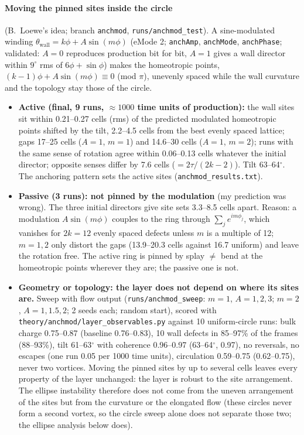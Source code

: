 \paragraph{Moving the pinned sites inside the circle} (B.~Loewe's idea; branch \texttt{anchmod}, \texttt{runs/anchmod\_test}). A sine-modulated winding
$\theta_\mathrm{wall}=k\phi+A\sin(m\phi)$ (eMode 2; \texttt{anchAmp}, \texttt{anchMode}, \texttt{anchPhase}; validated: $A=0$ reproduces production bit for bit, $A=1$
gives a wall director within $9^\circ$ rms of $6\phi+\sin\phi$) makes the homeotropic points, $(k-1)\phi+A\sin(m\phi)\equiv0$ (mod $\pi$), unevenly spaced while the
wall curvature and the topology stay those of the circle.
\begin{itemize}
  \item \textbf{Active (final, 9 runs, $\approx1000$ time units of production):} the wall sites sit within 0.21--0.27 cells (rms) of the predicted modulated
        homeotropic points shifted by the tilt, 2.2--4.5 cells from the best evenly spaced lattice; gaps 17--25 cells ($A=1$, $m=1$) and 14.6--30 cells ($A=1$, $m=2$);
        runs with the same sense of rotation agree within 0.06--0.13 cells whatever the initial director; opposite senses differ by 7.6 cells ($=2\tau/(2k-2)$). Tilt
        63--64$^\circ$. The anchoring pattern sets the active sites (\texttt{anchmod\_results.txt}).
  \item \textbf{Passive (3 runs): not pinned by the modulation} (my prediction was wrong). The three initial directors give site sets 3.3--8.5 cells apart. Reason: a
        modulation $A\sin(m\phi)$ couples to the ring through $\sum_je^{im\phi_j}$, which vanishes for $2k=12$ evenly spaced defects unless $m$ is a multiple of 12; $m=1,2$
        only distort the gaps (13.9--20.3 cells against 16.7 uniform) and leave the rotation free. The active ring is pinned by splay $\neq$ bend at the homeotropic points
        wherever they are; the passive one is not.
  \item \textbf{Geometry or topology: the layer does not depend on where its sites are.} Sweep with flow output (\texttt{runs/anchmod\_sweep}: $m=1$, $A=1,2,3$;
        $m=2$, $A=1,1.5,2$; 2 seeds each; random start), scored with \texttt{theory/anchmod/layer\_observables.py} against 10 uniform-circle runs: bulk charge
        0.75--0.87 (baseline 0.76--0.83), 10 wall defects in 85--97\% of the frames (88--93\%), tilt 61--63$^\circ$ with coherence 0.96--0.97 (63--64$^\circ$, 0.97), no
        reversals, no escapes (one run 0.05 per 1000 time units), circulation 0.59--0.75 (0.62--0.75), never two vortices. Moving the pinned sites by up to several cells
        leaves every property of the layer unchanged: the layer is robust to the site arrangement. The ellipse instability therefore does not come from the uneven
        arrangement of the sites but from the curvature or the elongated flow (these circles never form a second vortex, so the circle sweep alone does not separate those two;
        the ellipse analysis below does).
\end{itemize}

